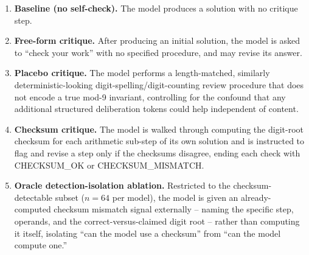 \documentclass[11pt,letterpaper]{article}
\begin{document}
\begin{enumerate}
\item \textbf{Baseline (no self-check).} The model produces a solution with no critique step.
\item \textbf{Free-form critique.} After producing an initial solution, the model is asked to ``check your work'' with no specified procedure, and may revise its answer.
\item \textbf{Placebo critique.} The model performs a length-matched, similarly deterministic-looking digit-spelling/digit-counting review procedure that does not encode a true mod-9 invariant, controlling for the confound that any additional structured deliberation tokens could help independent of content.
\item \textbf{Checksum critique.} The model is walked through computing the digit-root checksum for each arithmetic sub-step of its own solution and is instructed to flag and revise a step only if the checksums disagree, ending each check with CHECKSUM\_OK or CHECKSUM\_MISMATCH.
\item \textbf{Oracle detection-isolation ablation.} Restricted to the checksum-detectable subset ($n=64$ per model), the model is given an already-computed checksum mismatch signal externally -- naming the specific step, operands, and the correct-versus-claimed digit root -- rather than computing it itself, isolating ``can the model use a checksum'' from ``can the model compute one.''
\end{enumerate}
\end{document}
